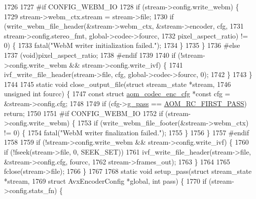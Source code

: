 \begin{DoxyCodeInclude}
{{{{{{{{{{{{{{{{{{{{{{{{{{{{{{{1726 
1727 \textcolor{preprocessor}{#if CONFIG\_WEBM\_IO}
1728   \textcolor{keywordflow}{if} (stream->config.write\_webm) \{
1729     stream->webm\_ctx.stream = stream->file;
1730     \textcolor{keywordflow}{if} (write\_webm\_file\_header(&stream->webm\_ctx, &stream->encoder, cfg,
1731                                stream->config.stereo\_fmt, global->codec->fourcc,
1732                                pixel\_aspect\_ratio) != 0) \{
1733       fatal(\textcolor{stringliteral}{"WebM writer initialization failed."});
1734     \}
1735   \}
1736 \textcolor{preprocessor}{#else}
1737   (void)pixel\_aspect\_ratio;
1738 \textcolor{preprocessor}{#endif}
1739 
1740   \textcolor{keywordflow}{if} (!stream->config.write\_webm && stream->config.write\_ivf) \{
1741     ivf\_write\_file\_header(stream->file, cfg, global->codec->fourcc, 0);
1742   \}
1743 \}
1744 
1745 \textcolor{keyword}{static} \textcolor{keywordtype}{void} close\_output\_file(\textcolor{keyword}{struct} stream\_state *stream,
1746                               \textcolor{keywordtype}{unsigned} \textcolor{keywordtype}{int} fourcc) \{
1747   \textcolor{keyword}{const} \textcolor{keyword}{struct }\hyperlink{structaom__codec__enc__cfg}{aom\_codec\_enc\_cfg} *\textcolor{keyword}{const} cfg = &stream->config.cfg;
1748 
1749   \textcolor{keywordflow}{if} (cfg->\hyperlink{structaom__codec__enc__cfg_aad58e4d10c7904d50ce959aef202dc64}{g\_pass} == \hyperlink{group__encoder_gga92b6709b58dc3435e3ba652da562eda1ad342b33a290482c20238bfde5d9bea1e}{AOM\_RC\_FIRST\_PASS}) \textcolor{keywordflow}{return};
1750 
1751 \textcolor{preprocessor}{#if CONFIG\_WEBM\_IO}
1752   \textcolor{keywordflow}{if} (stream->config.write\_webm) \{
1753     \textcolor{keywordflow}{if} (write\_webm\_file\_footer(&stream->webm\_ctx) != 0) \{
1754       fatal(\textcolor{stringliteral}{"WebM writer finalization failed."});
1755     \}
1756   \}
1757 \textcolor{preprocessor}{#endif}
1758 
1759   \textcolor{keywordflow}{if} (!stream->config.write\_webm && stream->config.write\_ivf) \{
1760     \textcolor{keywordflow}{if} (!fseek(stream->file, 0, SEEK\_SET))
1761       ivf\_write\_file\_header(stream->file, &stream->config.cfg, fourcc,
1762                             stream->frames\_out);
1763   \}
1764 
1765   fclose(stream->file);
1766 \}
1767 
1768 \textcolor{keyword}{static} \textcolor{keywordtype}{void} setup\_pass(\textcolor{keyword}{struct} stream\_state *stream,
1769                        \textcolor{keyword}{struct} AvxEncoderConfig *global, \textcolor{keywordtype}{int} pass) \{
1770   \textcolor{keywordflow}{if} (stream->config.stats\_fn) \{
}}}}}}}}}}}}}}}}}}}}}}}}}}}}}}}
\end{DoxyCodeInclude}
